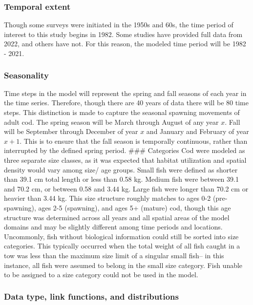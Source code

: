 \documentclass[
]{article}
\begin{document}
\hypertarget{temporal-extent}{%
\subsubsection{Temporal extent}\label{temporal-extent}}

Though some surveys were initiated in the 1950s and 60s, the time period of interest to this study begins in 1982. Some studies have provided full data from 2022, and others have not. For this reason, the modeled time period will be 1982 - 2021.

\hypertarget{seasonality}{%
\subsubsection{Seasonality}\label{seasonality}}

Time steps in the model will represent the spring and fall seasons of each year in the time series. Therefore, though there are 40 years of data there will be 80 time steps. This distinction is made to capture the seasonal spawning movements of adult cod. The spring season will be March through August of any year \(x\). Fall will be September through December of year \(x\) and January and February of year \(x+1\). This is to ensure that the fall season is temporally continuous, rather than interrupted by the defined spring period.
\#\#\# Categories
Cod were modeled as three separate size classes, as it was expected that habitat utilization and spatial density would vary among size/ age groups. Small fish were defined as shorter than 39.1 cm total length or less than 0.58 kg. Medium fish were between 39.1 and 70.2 cm, or between 0.58 and 3.44 kg. Large fish were longer than 70.2 cm or heavier than 3.44 kg. This size structure roughly matches to ages 0-2 (pre-spawning), ages 2-5 (spawning), and ages 5+ (mature) cod, though this age structure was determined across all years and all spatial areas of the model domains and may be slightly different among time periods and locations. Uncommonly, fish without biological information could still be sorted into size categories. This typically occurred when the total weight of all fish caught in a tow was less than the maximum size limit of a singular small fish-- in this instance, all fish were assumed to belong in the small size category. Fish unable to be assigned to a size category could not be used in the model.

\hypertarget{data-type-link-functions-and-distributions}{%
\subsubsection{Data type, link functions, and distributions}\label{data-type-link-functions-and-distributions}}
\end{document}
